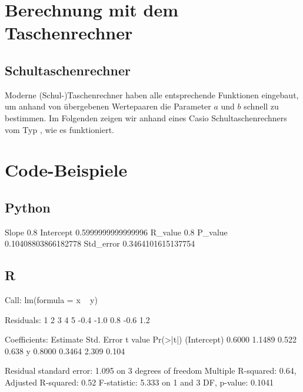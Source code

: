 \documentclass[ngerman, 12pt]{scrartcl}
\begin{document}
\section{Berechnung mit dem Taschenrechner}

\subsection{Schultaschenrechner}

Moderne (Schul-)Taschenrechner haben alle entsprechende Funktionen eingebaut, um anhand von übergebenen Wertepaaren die Parameter $a$ und $b$ schnell zu bestimmen. Im Folgenden zeigen wir anhand eines Casio Schultaschenrechners vom Typ , wie es funktioniert. 



\section{Code-Beispiele}


\subsection{Python}




\begin{ausgabe}
Slope 0.8
Intercept 0.5999999999999996
R_value 0.8
P_value 0.10408803866182778
Std_error 0.3464101615137754
\end{ausgabe}

\subsection{R}




\begin{ausgabe}
Call:
lm(formula = x ~ y)

Residuals:
   1    2    3    4    5 
-0.4 -1.0  0.8 -0.6  1.2 

Coefficients:
            Estimate Std. Error t value Pr(>|t|)
(Intercept)   0.6000     1.1489   0.522    0.638
y             0.8000     0.3464   2.309    0.104

Residual standard error: 1.095 on 3 degrees of freedom
Multiple R-squared:   0.64,     Adjusted R-squared:   0.52 
F-statistic: 5.333 on 1 and 3 DF,  p-value: 0.1041
\end{ausgabe}
\end{document}

